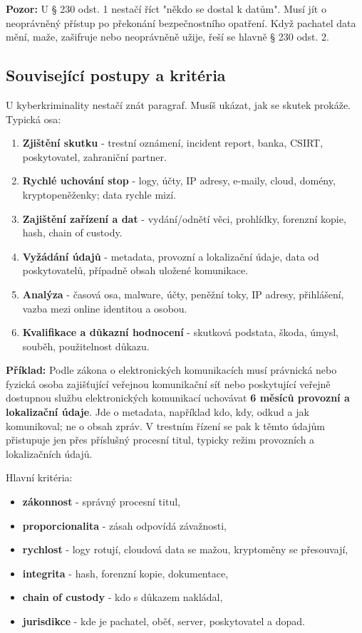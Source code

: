 \documentclass[11pt,a4paper]{article}
\newcommand{\pozor}[1]{\begin{tcolorbox}[breakable,enhanced,colback=red!7,colframe=red!30!black,boxrule=0pt,arc=1mm,left=5pt,right=5pt,top=5pt,bottom=5pt,before skip=6pt,after skip=6pt]\textbf{Pozor:} #1\end{tcolorbox}}
\newcommand{\priklad}[1]{\begin{tcolorbox}[breakable,enhanced,colback=green!7,colframe=green!30!black,boxrule=0pt,arc=1mm,left=5pt,right=5pt,top=5pt,bottom=5pt,before skip=6pt,after skip=6pt]\textbf{Příklad:} #1\end{tcolorbox}}
\begin{document}
\pozor{U § 230 odst. 1 nestačí říct "někdo se dostal k datům". Musí jít o neoprávněný přístup po překonání bezpečnostního opatření. Když pachatel data mění, maže, zašifruje nebo neoprávněně užije, řeší se hlavně § 230 odst. 2.}

\subsection*{Související postupy a kritéria}
U kyberkriminality nestačí znát paragraf. Musíš ukázat, jak se skutek prokáže. Typická osa:
\begin{enumerate}
  \item \textbf{Zjištění skutku} - trestní oznámení, incident report, banka, CSIRT, poskytovatel, zahraniční partner.
  \item \textbf{Rychlé uchování stop} - logy, účty, IP adresy, e-maily, cloud, domény, kryptopeněženky; data rychle mizí.
  \item \textbf{Zajištění zařízení a dat} - vydání/odnětí věci, prohlídky, forenzní kopie, hash, chain of custody.
  \item \textbf{Vyžádání údajů} - metadata, provozní a lokalizační údaje, data od poskytovatelů, případně obsah uložené komunikace.
  \item \textbf{Analýza} - časová osa, malware, účty, peněžní toky, IP adresy, přihlášení, vazba mezi online identitou a osobou.
  \item \textbf{Kvalifikace a důkazní hodnocení} - skutková podstata, škoda, úmysl, souběh, použitelnost důkazu.
\end{enumerate}

\priklad{Podle zákona o elektronických komunikacích musí právnická nebo fyzická osoba zajišťující veřejnou komunikační síť nebo poskytující veřejně dostupnou službu elektronických komunikací uchovávat \textbf{6 měsíců provozní a lokalizační údaje}. Jde o metadata, například kdo, kdy, odkud a jak komunikoval; ne o obsah zpráv. V trestním řízení se pak k těmto údajům přistupuje jen přes příslušný procesní titul, typicky režim provozních a lokalizačních údajů.}

Hlavní kritéria:
\begin{itemize}
  \item \textbf{zákonnost} - správný procesní titul,
  \item \textbf{proporcionalita} - zásah odpovídá závažnosti,
  \item \textbf{rychlost} - logy rotují, cloudová data se mažou, kryptoměny se přesouvají,
  \item \textbf{integrita} - hash, forenzní kopie, dokumentace,
  \item \textbf{chain of custody} - kdo s důkazem nakládal,
  \item \textbf{jurisdikce} - kde je pachatel, oběť, server, poskytovatel a dopad.
\end{itemize}
\end{document}
